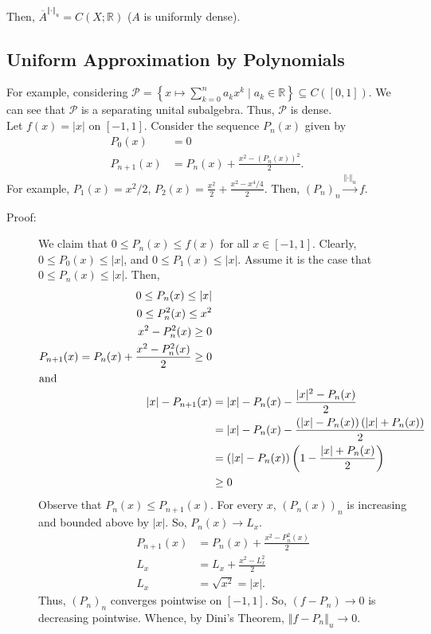 \documentclass[9pt]{extarticle}
\newcommand{\R}{\mathbb{R}}
\newcommand{\norm}[1]{\left\Vert #1 \right\Vert}
\begin{document}
  Then, $\overline{A}^{\norm{\cdot}_u} = C(X;\R)$ ($A$ is uniformly dense).
  \subsection{Uniform Approximation by Polynomials}%
  For example, considering $\mathcal{P} = \left\{x\mapsto \sum_{k=0}^{n}a_kx^k\mid a_k\in \R\right\}\subseteq C([0,1])$. We can see that $\mathcal{P}$ is a separating unital subalgebra. Thus, $\mathcal{P}$ is dense.\\

  Let $f(x) = |x|$ on $[-1,1]$. Consider the sequence $P_n(x)$ given by
  \begin{align*}
    P_0(x) &= 0\\
    P_{n+1}(x) &= P_n(x) + \frac{x^2 - (P_n(x))^2}{2}.
  \end{align*}
  For example, $P_1(x) = x^2/2$, $P_2(x) = \frac{x^2}{2} + \frac{x^2 - x^4/4}{2}$. Then, $(P_n)_n \xrightarrow{\norm{\cdot}_u} f$.
  \begin{description}
    \item[Proof:] We claim that $0\leq P_n(x)\leq f(x)$ for all $x\in [-1,1]$. Clearly, $0\leq P_0(x) \leq |x|$, and $0 \leq P_1(x)\leq |x|$. Assume it is the case that $0\leq P_n(x) \leq |x|$. Then,
      \begin{align*}
        0\leq P_n(x) \leq |x|\\
        0\leq P_n^2(x) \leq x^2\\
        x^2 - P_n^2(x) \geq 0\\
        P_{n+1}(x) = P_{n}(x) + \frac{x^2-P_n^2(x)}{2} \geq 0\\
        \intertext{and}
        |x| - P_{n+1}(x) &= |x| - P_n(x) - \frac{|x|^2 - P_n(x)}{2}\\
                         &= |x| - P_n(x) - \frac{\left(|x|-P_n(x)\right)\left(|x| + P_n(x)\right)}{2}\\
                         &= \left(|x|-P_n(x)\right)\left(1-\frac{|x| + P_n(x)}{2}\right)\\
                         &\geq 0
      \end{align*}
      Observe that $P_n(x) \leq P_{n+1}(x)$. For every $x$, $(P_n(x))_n$ is increasing and bounded above by $|x|$. So, $P_n(x) \rightarrow L_x$.
      \begin{align*}
        P_{n+1}(x) &= P_{n}(x) + \frac{x^2 - P_n^2(x)}{2}\\
        L_x &= L_x + \frac{x^2 - L_x^2}{2}\\
        L_x &= \sqrt{x^2} = |x|.
      \end{align*}
      Thus, $(P_n)_n$ converges pointwise on $[-1,1]$. So, $(f-P_n)\rightarrow 0$ is decreasing pointwise. Whence, by Dini's Theorem, $\norm{f-P_n}_u \rightarrow 0$.
  \end{description}
\end{document}
